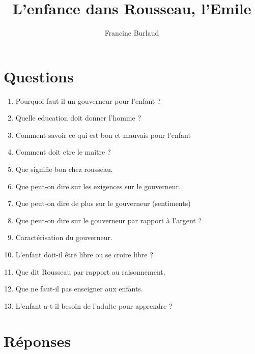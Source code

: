 \documentclass[a4paper, 11pt, hidelinks]{article}
\begin{document}
\title{L'enfance dans Rousseau, l'Emile}
\author{Francine Burlaud}

\maketitle

\tableofcontents


\newpage




\section{Questions}



\begin{enumerate}
    \item Pourquoi faut-il un gouverneur pour l'enfant ?
    \item Quelle education doit donner l'homme ?
    \item Comment savoir ce qui est bon et mauvais pour l'enfant
    \item Comment doit etre le maitre ?
    \item Que signifie bon chez rousseau.
    \item Que peut-on dire sur les exigences sur le gouverneur.
    \item Que peut-on dire de plus sur le gouverneur (sentiments)
    \item Que peut-on dire sur le gouverneur par rapport à l'argent ?
    \item Caractérisation du gouverneur.
    \item L'enfant doit-il être libre ou se croire libre ?
    \item Que dit Rousseau par rapport au raisonnement.
    \item Que ne faut-il pas enseigner aux enfants.
    \item L'enfant a-t-il besoin de l'adulte pour apprendre ?
\end{enumerate}


\section{Réponses}
\end{document}
